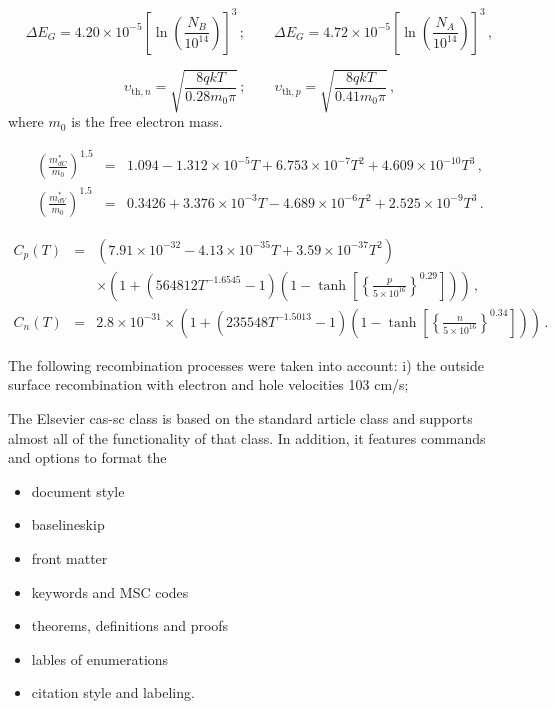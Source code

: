 \documentclass[a4paper,fleqn]{cas-sc}
\begin{document}
\begin{equation}
\label{eqDelEg}
    \Delta E_G=4.20\times10^{-5}\left[\ln\left(\frac{N_B}{10^{14}}\right)\right]^3\,;\qquad
     \Delta E_G=4.72\times10^{-5}\left[\ln\left(\frac{N_A}{10^{14}}\right)\right]^3\,,
\end{equation}

\begin{equation}
\label{eqVth}
    \upsilon_{\mathrm{th},n}=\sqrt{\frac{8qkT}{0.28m_0\pi}}\,;\qquad
    \upsilon_{\mathrm{th},p}=\sqrt{\frac{8qkT}{0.41m_0\pi}}\,,
\end{equation}
where
$m_0$ is the free electron mass.


\begin{eqnarray}
  \left(\frac{m^*_{dC}}{m_0}\right)^{1.5} &=& 1.094-1.312\times10^{-5}T+6.753\times10^{-7}T^2+4.609\times10^{-10}T^3\,, \\
  \left(\frac{m^*_{dV}}{m_0}\right)^{1.5} &=& 0.3426+3.376\times10^{-3}T-4.689\times10^{-6}T^2+2.525\times10^{-9}T^3\,.
\end{eqnarray}

\begin{eqnarray}
   \nonumber C_{p} (T)&=& (7.91\times10^{-32}-4.13\times10^{-35}T+3.59\times10^{-37}T^2)\\
  &&\times\left(1+\left(564812T^{-1.6545}-1\right)\left(1-\tanh\left[\left\{\frac{p}{5\times10^{16}}\right\}^{0.29}\right]\right)\right)\,, \\
   C_{n} (T)&=& 2.8\times10^{-31}
  \times\left(1+\left(235548T^{-1.5013}-1\right)\left(1-\tanh\left[\left\{\frac{n}{5\times10^{16}}\right\}^{0.34}\right]\right)\right)\,.
\end{eqnarray}


The following recombination processes were taken into account: i) the outside surface recombination with electron and hole velocities 103 cm/s; 






The Elsevier cas-sc class is based on the
standard article class and supports almost all of the functionality of
that class. In addition, it features commands and options to format the
\begin{itemize} \item document style \item baselineskip \item front
matter \item keywords and MSC codes \item theorems, definitions and
proofs \item lables of enumerations \item citation style and labeling.
\end{itemize}
\end{document}
